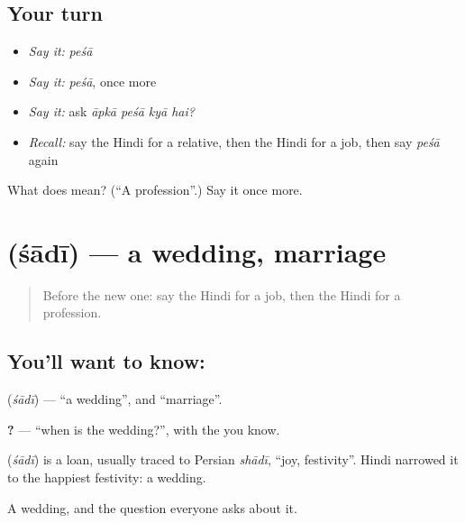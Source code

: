 \subsection*{Your turn}
\begin{itemize}
\raggedright
  \item \emph{Say it:} \emph{peśā}
  \item \emph{Say it:} \emph{peśā}, once more
  \item \emph{Say it:} ask \emph{āpkā peśā kyā hai?}
  \item \emph{Recall:} say the Hindi for a relative, then the Hindi for a job, then say \emph{peśā} again
\end{itemize}

\begin{tcolorbox}[breakable,colback=teal!4,colframe=teal!35!black,title={Before you move on}]
What does  mean? (\textquotedblleft{}A profession\textquotedblright{}.) Say it once more.
\end{tcolorbox}
\section[\texorpdfstring{\hi{शादी} (śādī)}{शादी (śādī)}]{ (śādī) — a wedding, marriage}

\label{lesson:HI-C119-shadi}



\begin{quote}
Before the new one: say the Hindi for a job, then the Hindi for a profession.
\end{quote}

\subsection*{You'll want to know: }
\textbf{} (\emph{śādī}) — \textquotedblleft{}a wedding\textquotedblright{}, and \textquotedblleft{}marriage\textquotedblright{}.

\textbf{  ?} — \textquotedblleft{}when is the wedding?\textquotedblright{}, with the \textbf{} you know.

\begin{cousinweb}
\textbf{} (\emph{śādī}) is a loan, usually traced to Persian \emph{shādī}, \textquotedblleft{}joy, festivity\textquotedblright{}. Hindi narrowed it to the happiest festivity: a wedding.
\end{cousinweb}

\begin{grammarlens}[title={What you've built}]
A wedding, and the question everyone asks about it.
\end{grammarlens}

